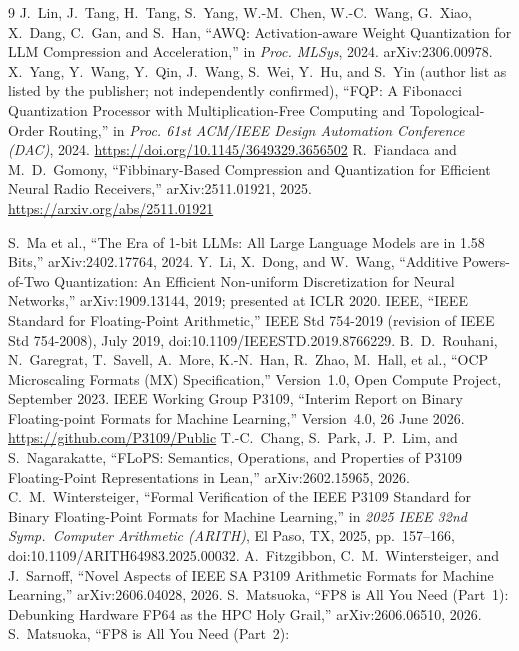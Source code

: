 \documentclass[11pt]{article}
\theoremstyle{definition}
\begin{document}
\begin{thebibliography}{9}
 J.~Lin, J.~Tang, H.~Tang, S.~Yang, W.-M.~Chen, W.-C.~Wang,
G.~Xiao, X.~Dang, C.~Gan, and S.~Han, ``AWQ: Activation-aware Weight
Quantization for LLM Compression and Acceleration,'' in
\emph{Proc. MLSys}, 2024. arXiv:2306.00978.
 X.~Yang, Y.~Wang, Y.~Qin, J.~Wang, S.~Wei, Y.~Hu, and S.~Yin
(author list as listed by the publisher; not independently confirmed),
``FQP: A Fibonacci Quantization Processor with Multiplication-Free Computing and
Topological-Order Routing,'' in \emph{Proc. 61st ACM/IEEE Design Automation
Conference (DAC)}, 2024. \url{https://doi.org/10.1145/3649329.3656502}
 R.~Fiandaca and M.~D.~Gomony, ``Fibbinary-Based Compression
and Quantization for Efficient Neural Radio Receivers,'' arXiv:2511.01921, 2025. \url{https://arxiv.org/abs/2511.01921}

 S.~Ma et al., ``The Era of 1-bit LLMs: All Large Language Models are in 1.58 Bits,'' arXiv:2402.17764, 2024.
 Y.~Li, X.~Dong, and W.~Wang, ``Additive Powers-of-Two
Quantization: An Efficient Non-uniform Discretization for Neural Networks,''
arXiv:1909.13144, 2019; presented at ICLR 2020.
 IEEE, ``IEEE Standard for Floating-Point Arithmetic,''
IEEE Std 754-2019 (revision of IEEE Std 754-2008), July 2019,
doi:10.1109/IEEESTD.2019.8766229.
 B.~D.~Rouhani, N.~Garegrat, T.~Savell, A.~More, K.-N.~Han,
R.~Zhao, M.~Hall, et al., ``OCP Microscaling Formats (MX) Specification,''
Version~1.0, Open Compute Project, September 2023.
 IEEE Working Group P3109, ``Interim Report on Binary
Floating-point Formats for Machine Learning,'' Version~4.0, 26 June 2026.
\url{https://github.com/P3109/Public}
 T.-C.~Chang, S.~Park, J.~P.~Lim, and S.~Nagarakatte,
``FLoPS: Semantics, Operations, and Properties of P3109 Floating-Point
Representations in Lean,'' arXiv:2602.15965, 2026.
 C.~M.~Wintersteiger, ``Formal Verification of the
IEEE P3109 Standard for Binary Floating-Point Formats for Machine Learning,'' in
\emph{2025 IEEE 32nd Symp.\ Computer Arithmetic (ARITH)}, El Paso, TX, 2025,
pp.~157--166, doi:10.1109/ARITH64983.2025.00032.
 A.~Fitzgibbon, C.~M.~Wintersteiger, and
J.~Sarnoff, ``Novel Aspects of IEEE SA P3109 Arithmetic Formats for Machine
Learning,'' arXiv:2606.04028, 2026.
 S.~Matsuoka, ``FP8 is All You Need (Part~1):
Debunking Hardware FP64 as the HPC Holy Grail,'' arXiv:2606.06510, 2026.
 S.~Matsuoka, ``FP8 is All You Need (Part~2):

\end{thebibliography}
\end{document}
